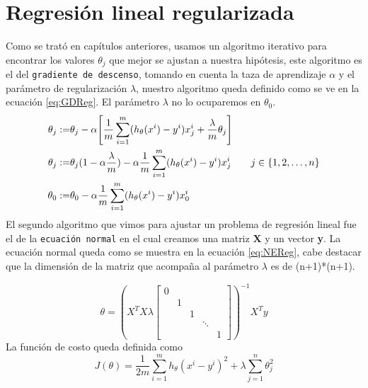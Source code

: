 \documentclass{report}
\begin{document}
\section{Regresión lineal regularizada}
Como se trató en capítulos anteriores, usamos un algoritmo iterativo para encontrar los valores $ \theta_j $ que mejor se ajustan a nuestra hipótesis, este algoritmo es el del \texttt{gradiente de descenso}, tomando en cuenta la taza de aprendizaje $ \alpha $ y el parámetro de regularización $ \lambda $, nuestro algoritmo queda definido como se ve en la ecuación \ref{eq:GDReg}. El parámetro $ \lambda $ no lo ocuparemos en $ \theta_0 $.
\begin{align}\notag
	\theta_j:=&\theta_j-\alpha\Bigg[\frac{1}{m}\sum_{i=1}^{m}(h_\theta(x^i)-y^i)x_j^i+\frac{\lambda}{m}\theta_j\Bigg]\\
	\theta_j:=&\theta_j(1-\alpha\frac{\lambda}{m})-\alpha\frac{1}{m}\sum_{i=1}^{m}(h_\theta(x^i)-y^i)x_j^i\qquad j\in\{1,2,\dots,n\}
	\label{eq:GDReg}\\
	\theta_0:=&\theta_0-\alpha\frac{1}{m}\sum_{i=1}^{m}(h_\theta(x^i)-y^i)x_0^i
\end{align}
El segundo algoritmo que vimos para ajustar un problema de regresión lineal fue el de la \texttt{ecuación normal} en el cual creamos una matriz $ \mathbf{X} $ y un vector \textbf{y}. La ecuación normal queda como se muestra en la ecuación \ref{eq:NEReg}, cabe destacar que la dimensión de la matriz que acompaña al parámetro $ \lambda $ es de (n+1)*(n+1). 

\begin{equation}
	\theta = \left(X^TX\lambda
	\begin{bmatrix}
		0&&&&\\
		&1&&&\\
		&&1&&\\
		&&&\ddots&\\
		&&&&1
	\end{bmatrix}
	\right)^{-1}X^Ty
	\label{eq:NEReg}
\end{equation}
La función de costo queda definida como
\[
	J(\theta)=\frac{1}{2m}\sum_{i=1}^{m}h_\theta(x^i-y^i)^2+\lambda\sum_{j=1}^{n}\theta_j^2
\]
\end{document}
